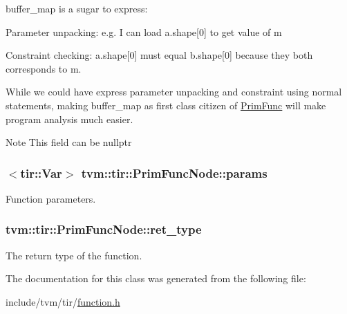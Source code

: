 buffer\+\_\+map is a sugar to express\+:
\begin{DoxyItemize}
\item Parameter unpacking\+: e.\+g. I can load a.\+shape\mbox{[}0\mbox{]} to get value of m
\item Constraint checking\+: a.\+shape\mbox{[}0\mbox{]} must equal b.\+shape\mbox{[}0\mbox{]} because they both corresponds to m.
\end{DoxyItemize}

While we could have express parameter unpacking and constraint using normal statements, making buffer\+\_\+map as first class citizen of \hyperlink{classtvm_1_1tir_1_1PrimFunc}{Prim\+Func} will make program analysis much easier.

\begin{DoxyNote}{Note}
This field can be nullptr 
\end{DoxyNote}
\subsubsection[{\texorpdfstring{params}{params}}]{$<${\bf tir\+::\+Var}$>$ tvm\+::tir\+::\+Prim\+Func\+Node\+::params}\hypertarget{classtvm_1_1tir_1_1PrimFuncNode_a4ea77411935e78d975414f31e153fc78}{}\label{classtvm_1_1tir_1_1PrimFuncNode_a4ea77411935e78d975414f31e153fc78}


Function parameters. 

\subsubsection[{\texorpdfstring{ret\+\_\+type}{ret_type}}]{ tvm\+::tir\+::\+Prim\+Func\+Node\+::ret\+\_\+type}\hypertarget{classtvm_1_1tir_1_1PrimFuncNode_aa325068615c301abec6656416cab8e09}{}\label{classtvm_1_1tir_1_1PrimFuncNode_aa325068615c301abec6656416cab8e09}


The return type of the function. 



The documentation for this class was generated from the following file\+:\begin{DoxyCompactItemize}
\item 
include/tvm/tir/\hyperlink{tir_2function_8h}{function.\+h}\end{DoxyCompactItemize}
